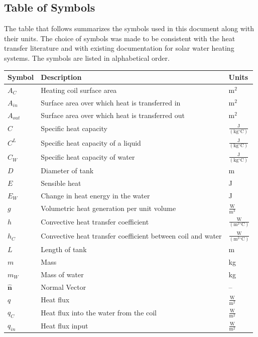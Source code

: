 \documentclass[12pt]{article}
\begin{document}
\subsection{Table of Symbols}
\label{Sec:ToS}
The table that follows summarizes the symbols used in this document along with their units. The choice of symbols was made to be consistent with the heat transfer literature and with existing documentation for solar water heating systems. The symbols are listed in alphabetical order.
\begin{longtabu}{l X[l] l}
\toprule
\textbf{Symbol} & \textbf{Description} & \textbf{Units}
\\
\midrule
\endhead
${A_{C}}$ & Heating coil surface area & $\text{m}^{2}$
\\
${A_{in}}$ & Surface area over which heat is transferred in & $\text{m}^{2}$
\\
${A_{out}}$ & Surface area over which heat is transferred out & $\text{m}^{2}$
\\
$C$ & Specific heat capacity & $\frac{\text{J}}{(\text{kg}{}^{\circ}\text{C})}$
\\
${C^{L}}$ & Specific heat capacity of a liquid & $\frac{\text{J}}{(\text{kg}{}^{\circ}\text{C})}$
\\
${C_{W}}$ & Specific heat capacity of water & $\frac{\text{J}}{(\text{kg}{}^{\circ}\text{C})}$
\\
$D$ & Diameter of tank & m
\\
$E$ & Sensible heat & J
\\
${E_{W}}$ & Change in heat energy in the water & J
\\
$g$ & Volumetric heat generation per unit volume & $\frac{\text{W}}{\text{m}^{3}}$
\\
$h$ & Convective heat transfer coefficient & $\frac{\text{W}}{(\text{m}^{2}{}^{\circ}\text{C})}$
\\
${h_{C}}$ & Convective heat transfer coefficient between coil and water & $\frac{\text{W}}{(\text{m}^{2}{}^{\circ}\text{C})}$
\\
$L$ & Length of tank & m
\\
$m$ & Mass & kg
\\
${m_{W}}$ & Mass of water & kg
\\
$\mathbf{\hat{n}}$ & Normal Vector & --
\\
$q$ & Heat flux & $\frac{\text{W}}{\text{m}^{2}}$
\\
${q_{C}}$ & Heat flux into the water from the coil & $\frac{\text{W}}{\text{m}^{2}}$
\\
${q_{in}}$ & Heat flux input & $\frac{\text{W}}{\text{m}^{2}}$

\end{longtabu}
\end{document}
